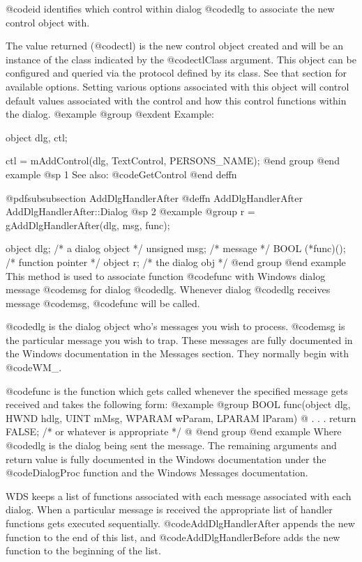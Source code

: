 @code{id} identifies which control within dialog @code{dlg} to associate
the new control object with.

The value returned (@code{ctl}) is the new control object created and
will be an instance of the class indicated by the @code{ctlClass}
argument.  This object can be configured and queried via the protocol
defined by its class.  See that section for available options.  Setting
various options associated with this object will control default values
associated with the control and how this control functions within the
dialog.
@example
@group
@exdent Example:

object  dlg, ctl;

ctl = mAddControl(dlg, TextControl, PERSONS_NAME);
@end group
@end example
@sp 1
See also:  @code{GetControl}
@end deffn






@pdfsubsubsection {AddDlgHandlerAfter}
@deffn {AddDlgHandlerAfter} AddDlgHandlerAfter::Dialog
@sp 2
@example
@group
r = gAddDlgHandlerAfter(dlg, msg, func);

object   dlg;      /*  a dialog object  */
unsigned msg;      /*  message          */
BOOL    (*func)(); /*  function pointer */
object  r;         /*  the dialog obj   */
@end group
@end example
This method is used to associate function @code{func} with Windows dialog
message @code{msg} for dialog @code{dlg}.  Whenever dialog @code{dlg}
receives message @code{msg}, @code{func} will be called.

@code{dlg} is the dialog object who's messages you wish to process.
@code{msg} is the particular message you wish to trap.  These messages
are fully documented in the Windows documentation in the Messages
section.  They normally begin with @code{WM_}.

@code{func} is the function which gets called whenever the specified
message gets received and takes the following form:
@example
@group
BOOL    func(object     dlg,
             HWND       hdlg, 
             UINT       mMsg, 
             WPARAM     wParam, 
             LPARAM     lParam)
@{
        .
        .
        .
        return FALSE;  /* or whatever is appropriate  */
@}
@end group
@end example
Where @code{dlg} is the dialog being sent the message.  The remaining
arguments and return value is fully documented in the Windows documentation
under the @code{DialogProc} function and the Windows Messages documentation.

WDS keeps a list of functions associated with each message associated
with each dialog.  When a particular message is received the appropriate
list of handler functions gets executed sequentially.
@code{AddDlgHandlerAfter} appends the new function to the end of this list,
and @code{AddDlgHandlerBefore} adds the new function to the beginning of
the list.

